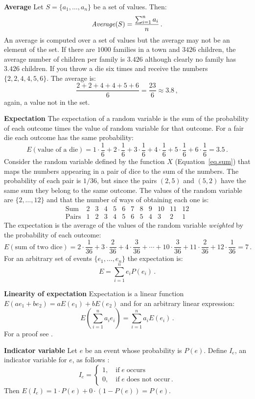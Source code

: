 \textbf{Average}
Let $S=\{a_1,\ldots,a_n\}$ be a set of values. Then:
\[
\mathit{Average}(S)=\displaystyle\frac{\sum_{i=1}^{n} a_i}{n}\,.
\]
An average is computed over a set of values but the average may not be an element of the set. If there are $1000$ families in a town and $3426$ children, the average number of children per family is $3.426$ although clearly no family has $3.426$ children. If you throw a die six times and receive the numbers $\{2,2,4,4,5,6\}$. The average is:
\[
\frac{2+2+4+4+5+6}{6}=\frac{23}{6}\approx 3.8\,,
\]
again, a value not in the set.

\textbf{Expectation}
The expectation of a random variable is the sum of the probability of each outcome times the value of random variable for that outcome. For a fair die each outcome has the same probability:
\[
E(\textrm{value of a die})=1\cdot \frac{1}{6} + 2\cdot\frac{1}{6} + 3\cdot\frac{1}{6} + 4\cdot\frac{1}{6} + 5\cdot\frac{1}{6} + 6\cdot\frac{1}{6}=3.5\,.
\]
Consider the random variable defined by the function $X$ (Equation~\ref{eq.sum}) that maps the numbers appearing in a pair of dice to the sum of the numbers. The probability of each pair is $1/36$, but since the pairs $(2,5)$ and $(5,2)$ have the same sum they belong to the same outcome. The values of the random variable are $\{2,\ldots,12\}$ and that the number of ways of obtaining each one is:
\[
\begin{array}{l|rrrrrrrrrrr}
\textrm{Sum} & 2 & 3 & 4 & 5 & 6 & 7 & 8 & 9 & 10 & 11 & 12\\\hline
\textrm{Pairs} & 1 & 2 & 3 & 4 & 5 & 6 & 5 & 4 & 3 & 2 & 1
\end{array}
\]
The expectation is the average of the values of the random variable \emph{weighted} by the probability of each outcome:
\[
E(\textrm{sum of two dice})=2\cdot \frac{1}{36} + 3\cdot \frac{2}{36} + 4\cdot \frac{3}{36} + 
\cdots + 10\cdot \frac{3}{36} + 11\cdot \frac{2}{36} + 12\cdot \frac{1}{36} = 7\,.
\]
For an arbitrary set of events $\{e_1,\ldots,e_n\}$ the expectation is:
\[
E=\sum_{i=1}^{n} e_iP(e_i)\,.
\]

\textbf{Linearity of expectation}\label{p.linearity}
Expectation is a linear function $E(ae_1 + be_2) = aE(e_1) + bE(e_2)$ and for an arbitrary linear expression:
\[
E\left(\sum_{i=1}^{n} a_ie_i\right)=\sum_{i=1}^{n} a_iE(e_i)\,.
\]
For a proof see \cite[Section~4.9]{ross}.

\textbf{Indicator variable} Let $e$ be an event whose probability is $P(e)$. Define $I_e$, an indicator variable for $e$, as follows \cite[Chapter~4, Example~3b]{ross}:
\[
I_e=
\left\{
\begin{array}{ll}
1,\quad \textrm{if}\; e\;\textrm{occurs}\\
0, \quad \textrm{if}\;e\;\textrm{does not occur}\,.
\end{array}
\right.
\]
Then $E(I_e)=1\cdot P(e) + 0\cdot (1-P(e))=P(e)$.

